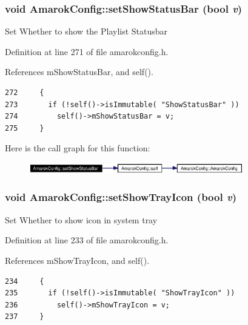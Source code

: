 \subsubsection{\setlength{\rightskip}{0pt plus 5cm}void Amarok\-Config::set\-Show\-Status\-Bar (bool {\em v})\hspace{0.3cm}{\tt  [inline, static]}}\label{classAmarokConfig_AmarokConfige27}


Set Whether to show the Playlist Statusbar 

Definition at line 271 of file amarokconfig.h.

References m\-Show\-Status\-Bar, and self().



\footnotesize\begin{verbatim}272     {
273       if (!self()->isImmutable( "ShowStatusBar" ))
274         self()->mShowStatusBar = v;
275     }
\end{verbatim}\normalsize 


Here is the call graph for this function:\begin{figure}[H]
\begin{center}
\leavevmode
\includegraphics[width=265pt]{classAmarokConfig_AmarokConfige27_cgraph}
\end{center}
\end{figure}
\subsubsection{\setlength{\rightskip}{0pt plus 5cm}void Amarok\-Config::set\-Show\-Tray\-Icon (bool {\em v})\hspace{0.3cm}{\tt  [inline, static]}}\label{classAmarokConfig_AmarokConfige23}


Set Whether to show icon in system tray 

Definition at line 233 of file amarokconfig.h.

References m\-Show\-Tray\-Icon, and self().



\footnotesize\begin{verbatim}234     {
235       if (!self()->isImmutable( "ShowTrayIcon" ))
236         self()->mShowTrayIcon = v;
237     }
\end{verbatim}\normalsize 


